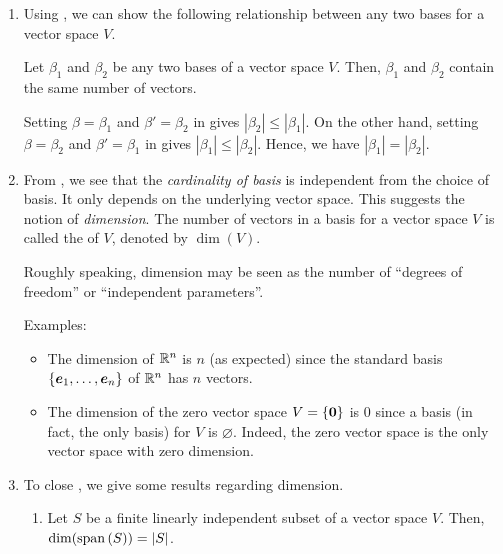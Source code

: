 \begin{enumerate}
\item
Using , we can show the following relationship between
any two bases for a vector space \(V\).

\begin{corollary}
\label{cor:two-bases-same-num}
Let \(\beta_1\) and \(\beta_2\) be any two bases of a vector space \(V\). Then,
\(\beta_1\) and \(\beta_2\) contain the same number of vectors.
\end{corollary}

\begin{pf}
Setting \(\beta=\beta_1\) and \(\beta'=\beta_2\) in 
gives \(|\beta_2|\le|\beta_1|\). On the other hand, setting \(\beta=\beta_2\)
and \(\beta'=\beta_1\) in  gives
\(|\beta_1|\le|\beta_2|\). Hence, we have \(|\beta_1|=|\beta_2|\).
\end{pf}

\item From , we see that the \emph{cardinality of
basis} is independent from the choice of basis. It only depends on the
underlying vector space. This suggests the notion of \emph{dimension}. The
number of vectors in a basis for a vector space \(V\) is called the
 of \(V\), denoted by \(\dim(V)\).

\begin{note}
Roughly speaking, dimension may be seen as the number of ``degrees of
freedom'' or ``independent parameters''.
\end{note}

Examples:
\begin{itemize}
\item The dimension of \(\mathbb{R}^n\) is \(n\) (as expected) since the
standard basis \(\{\vb*{e}_1,\dotsc,\vb*{e}_n\}\) of \(\mathbb{R}^n\) has
\(n\) vectors.
\item The dimension of the zero vector space \(V=\{\vb*{0}\}\) is 0
since a basis (in fact, the only basis) for \(V\) is \(\varnothing\).
Indeed, the zero vector space is the only vector space with zero
dimension.
\end{itemize}

\item To close , we give some results regarding dimension.
\begin{enumerate}
\item \label{it:dim-span} Let \(S\) be a finite linearly independent subset of
a vector space \(V\). Then, \(\dim(\operatorname{span}\qty(S))=|S|\).


\end{enumerate}
\end{enumerate}
